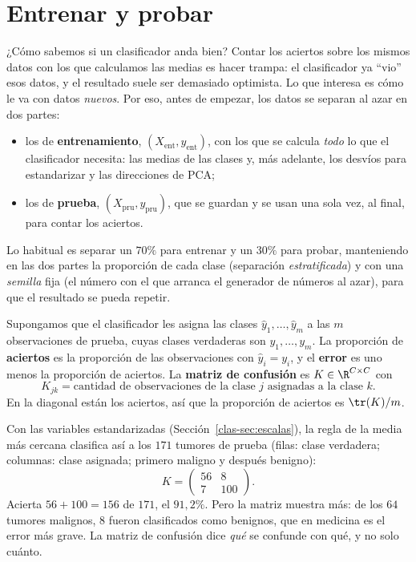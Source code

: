 \section{Entrenar y probar}\label{clas-sec:evaluar}

¿Cómo sabemos si un clasificador anda bien? Contar los aciertos sobre los
mismos datos con los que calculamos las medias es hacer trampa: el
clasificador ya ``vio'' esos datos, y el resultado suele ser demasiado
optimista. Lo que interesa es cómo le va con datos \emph{nuevos}. Por eso,
antes de empezar, los datos se separan al azar en dos partes:
\begin{itemize}[leftmargin=*,itemsep=1pt]
\item los de \textbf{entrenamiento}, $(X_{\text{ent}},y_{\text{ent}})$, con los
que se calcula \emph{todo} lo que el clasificador necesita: las medias de las
clases y, más adelante, los desvíos para estandarizar y las direcciones de
PCA;
\item los de \textbf{prueba}, $(X_{\text{pru}},y_{\text{pru}})$, que se guardan
y se usan una sola vez, al final, para contar los aciertos.
\end{itemize}
Lo habitual es separar un $70\%$ para entrenar y un $30\%$ para probar,
manteniendo en las dos partes la proporción de cada clase (separación
\emph{estratificada}) y con una \emph{semilla} fija (el número con el que
arranca el generador de números al azar), para que el resultado se pueda
repetir.

\begin{definition}\label{clas-def:confusion}
Supongamos que el clasificador les asigna las clases $\hat y_1,\dots,\hat y_m$
a las $m$ observaciones de prueba, cuyas clases verdaderas son
$y_1,\dots,y_m$. La proporción de \textbf{aciertos} es la proporción de las
observaciones con $\hat y_i=y_i$, y el \textbf{error} es uno menos la
proporción de aciertos. La \textbf{matriz de confusión} es $K\in\R^{C\times C}$ con
\[
K_{jk}=\text{cantidad de observaciones de la clase $j$ asignadas a la clase $k$}.
\]
En la diagonal están los aciertos, así que la proporción de aciertos es
$\tr(K)/m$.
\end{definition}

\begin{example}\label{clas-ej:mama-confusion}
Con las variables estandarizadas (Sección~\ref{clas-sec:escalas}), la regla de
la media más cercana clasifica así a los $171$ tumores de prueba (filas: clase
verdadera; columnas: clase asignada; primero maligno y después benigno):
\[
K=\begin{pmatrix}56&8\\7&100\end{pmatrix}.
\]
Acierta $56+100=156$ de $171$, el $91{,}2\%$. Pero la matriz muestra más: de
los $64$ tumores malignos, $8$ fueron clasificados como benignos, que en
medicina es el error más grave. La matriz de confusión dice \emph{qué} se confunde con
qué, y no solo cuánto.
\end{example}

